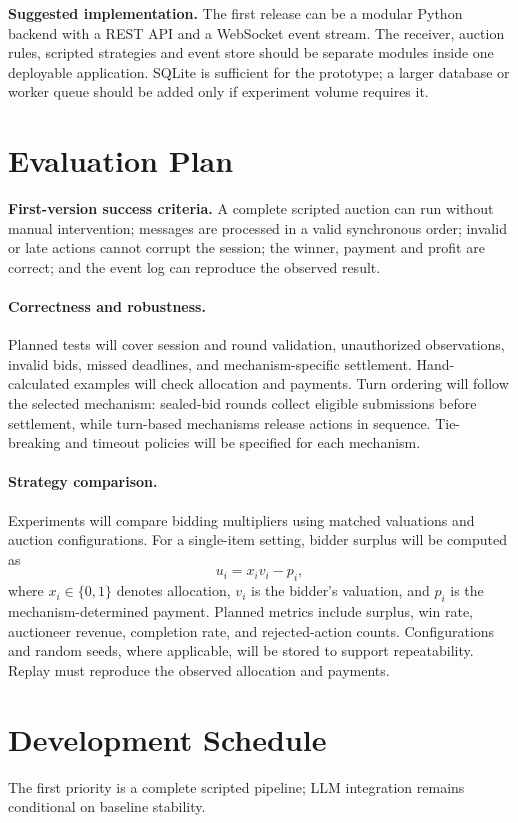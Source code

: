 \documentclass[11pt]{article}
\begin{document}
\textbf{Suggested implementation.} The first release can be a modular Python backend with a REST API and a WebSocket event stream. The receiver, auction rules, scripted strategies and event store should be separate modules inside one deployable application. SQLite is sufficient for the prototype; a larger database or worker queue should be added only if experiment volume requires it.

\section{Evaluation Plan}
\textbf{First-version success criteria.} A complete scripted auction can run without manual intervention; messages are processed in a valid synchronous order; invalid or late actions cannot corrupt the session; the winner, payment and profit are correct; and the event log can reproduce the observed result.

\paragraph{Correctness and robustness.}
Planned tests will cover session and round validation, unauthorized observations, invalid bids, missed deadlines, and mechanism-specific settlement. Hand-calculated examples will check allocation and payments. Turn ordering will follow the selected mechanism: sealed-bid rounds collect eligible submissions before settlement, while turn-based mechanisms release actions in sequence. Tie-breaking and timeout policies will be specified for each mechanism.

\paragraph{Strategy comparison.}
Experiments will compare bidding multipliers using matched valuations and auction configurations. For a single-item setting, bidder surplus will be computed as
\begin{equation}
 u_i = x_i v_i - p_i,
\end{equation}
where $x_i\in\{0,1\}$ denotes allocation, $v_i$ is the bidder's valuation, and $p_i$ is the mechanism-determined payment. Planned metrics include surplus, win rate, auctioneer revenue, completion rate, and rejected-action counts. Configurations and random seeds, where applicable, will be stored to support repeatability. Replay must reproduce the observed allocation and payments.

\section{Development Schedule}
The first priority is a complete scripted pipeline; LLM integration remains conditional on baseline stability.
\end{document}
